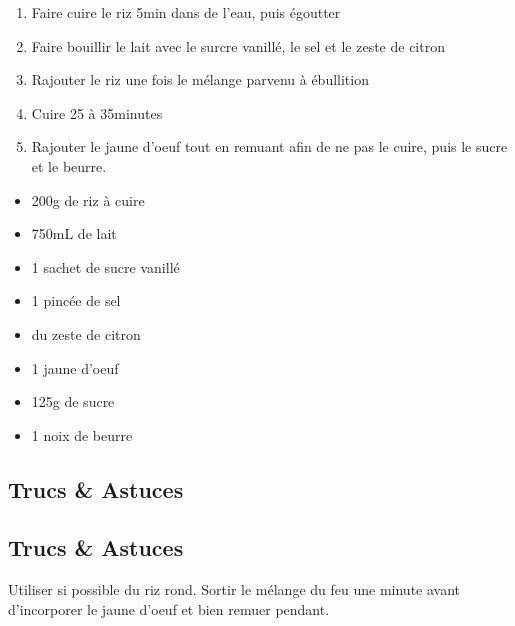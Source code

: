     \begin{minipage}{.7\textwidth}
        \begin{enumerate}
            \item Faire cuire le riz 5min dans de l'eau, puis égoutter
	    \item Faire bouillir le lait avec le surcre vanillé, le sel et le zeste de citron
	    \item Rajouter le riz une fois le mélange parvenu à ébullition
	    \item Cuire 25 à 35minutes 
	    \item Rajouter le jaune d'oeuf tout en remuant afin de ne pas le cuire, puis le sucre et le beurre.

        \end{enumerate}
    \end{minipage}
    \begin{minipage}{.3\textwidth}
        \begin{flushleft}
        \begin{itemize}
            \item 200g de riz à cuire
	    \item 750mL de lait
	    \item 1 sachet de sucre vanillé
	    \item 1 pincée de sel
	    \item du zeste de citron
	    \item 1 jaune d'oeuf
	    \item 125g de sucre
	    \item 1 noix de beurre

        \end{itemize}
        \end{flushleft}
    \end{minipage}
    
    \vspace{1cm}
    \hline
    \vspace{1cm}
    
    \subsection{Trucs \& Astuces}
        \subsection{Trucs \& Astuces}
	Utiliser si possible du riz rond. Sortir le mélange du feu une minute avant d'incorporer le jaune d'oeuf et bien remuer pendant.
